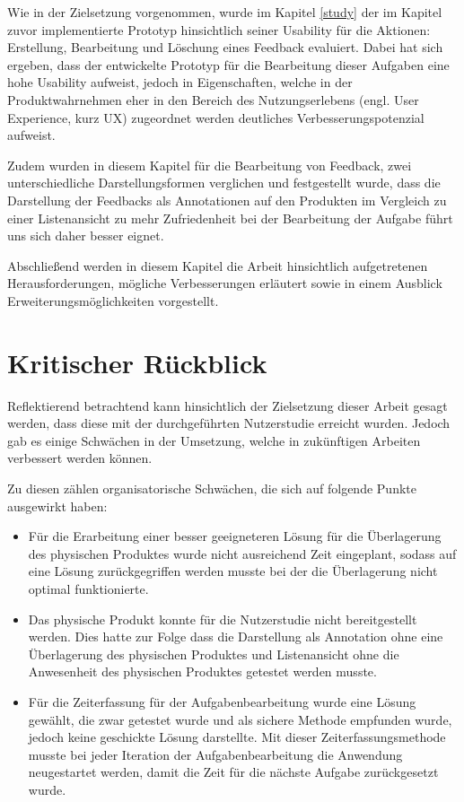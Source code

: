 Wie in der Zielsetzung vorgenommen, wurde im Kapitel \ref{study} der im Kapitel zuvor implementierte Prototyp hinsichtlich seiner Usability für die Aktionen: Erstellung, Bearbeitung und Löschung eines
Feedback evaluiert. Dabei hat sich ergeben, dass der entwickelte Prototyp für die Bearbeitung dieser Aufgaben eine hohe Usability aufweist, jedoch in Eigenschaften, welche in der Produktwahrnehmen eher 
in den Bereich des Nutzungserlebens (engl. User Experience, kurz UX) zugeordnet werden deutliches Verbesserungspotenzial aufweist. 

Zudem wurden in diesem Kapitel für die Bearbeitung von Feedback, zwei unterschiedliche Darstellungsformen verglichen und festgestellt wurde, dass 
die Darstellung der Feedbacks als Annotationen auf den Produkten im Vergleich zu einer Listenansicht zu mehr Zufriedenheit bei der Bearbeitung der Aufgabe führt uns sich daher besser eignet. 

Abschließend werden in diesem Kapitel die Arbeit hinsichtlich aufgetretenen Herausforderungen, mögliche Verbesserungen erläutert sowie in einem Ausblick Erweiterungsmöglichkeiten vorgestellt.  

\section{Kritischer Rückblick}

Reflektierend betrachtend kann hinsichtlich der Zielsetzung dieser Arbeit gesagt werden, dass diese mit der durchgeführten Nutzerstudie erreicht wurden.
Jedoch gab es einige Schwächen in der Umsetzung, welche in zukünftigen Arbeiten verbessert werden können. 

Zu diesen zählen organisatorische Schwächen, die sich auf folgende Punkte ausgewirkt haben:  

\begin{itemize}
\item{Für die Erarbeitung einer besser geeigneteren Lösung für die Überlagerung des physischen Produktes wurde nicht ausreichend Zeit eingeplant, sodass auf eine Lösung zurückgegriffen werden musste bei der 
die Überlagerung nicht optimal funktionierte.} 

\item{Das physische Produkt konnte für die Nutzerstudie nicht bereitgestellt werden. Dies hatte zur Folge dass die Darstellung als Annotation ohne eine Überlagerung des physischen Produktes und Listenansicht ohne die Anwesenheit des physischen Produktes getestet werden musste.}
\item{Für die Zeiterfassung für der Aufgabenbearbeitung wurde eine Lösung gewählt, die zwar getestet wurde und als sichere Methode empfunden wurde, jedoch 
keine geschickte Lösung darstellte. Mit dieser Zeiterfassungsmethode musste bei jeder Iteration der Aufgabenbearbeitung die Anwendung neugestartet werden, damit die Zeit für die nächste Aufgabe zurückgesetzt wurde.} 
\end{itemize}


